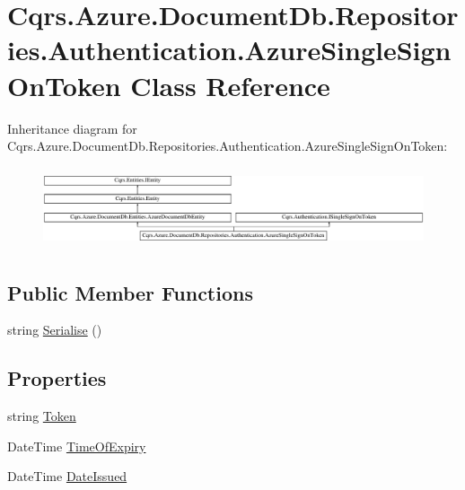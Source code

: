 \hypertarget{classCqrs_1_1Azure_1_1DocumentDb_1_1Repositories_1_1Authentication_1_1AzureSingleSignOnToken}{}\section{Cqrs.\+Azure.\+Document\+Db.\+Repositories.\+Authentication.\+Azure\+Single\+Sign\+On\+Token Class Reference}
\label{classCqrs_1_1Azure_1_1DocumentDb_1_1Repositories_1_1Authentication_1_1AzureSingleSignOnToken}
Inheritance diagram for Cqrs.\+Azure.\+Document\+Db.\+Repositories.\+Authentication.\+Azure\+Single\+Sign\+On\+Token\+:\begin{figure}[H]
\begin{center}
\leavevmode
\includegraphics[height=2.403434cm]{classCqrs_1_1Azure_1_1DocumentDb_1_1Repositories_1_1Authentication_1_1AzureSingleSignOnToken}
\end{center}
\end{figure}
\subsection*{Public Member Functions}
\begin{DoxyCompactItemize}
\item 
string \hyperlink{classCqrs_1_1Azure_1_1DocumentDb_1_1Repositories_1_1Authentication_1_1AzureSingleSignOnToken_a55c07b93600e6863985b50d4df346af0}{Serialise} ()
\end{DoxyCompactItemize}
\subsection*{Properties}
\begin{DoxyCompactItemize}
\item 
string \hyperlink{classCqrs_1_1Azure_1_1DocumentDb_1_1Repositories_1_1Authentication_1_1AzureSingleSignOnToken_ad8db4fad59b85056e4e37c9e29226425}{Token}
\item 
Date\+Time \hyperlink{classCqrs_1_1Azure_1_1DocumentDb_1_1Repositories_1_1Authentication_1_1AzureSingleSignOnToken_a72467ad344da70ee03355d03f9a3f25e}{Time\+Of\+Expiry}
\item 
Date\+Time \hyperlink{classCqrs_1_1Azure_1_1DocumentDb_1_1Repositories_1_1Authentication_1_1AzureSingleSignOnToken_a1443fa350c304438a9a57c458717eeef}{Date\+Issued}
\end{DoxyCompactItemize}


